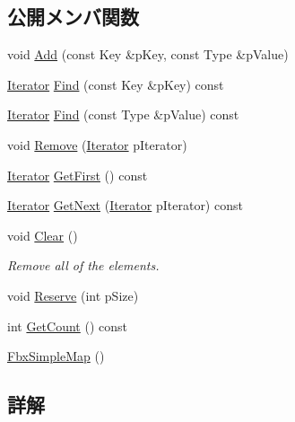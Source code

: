 \subsection*{公開メンバ関数}
\begin{DoxyCompactItemize}
\item 
void \hyperlink{class_fbx_simple_map_aff95473f35a67022ef78d6b81f72670b}{Add} (const Key \&p\+Key, const Type \&p\+Value)
\item 
\hyperlink{class_fbx_simple_map_aaa589eb5e1ccdd11dffd018f3212e13e}{Iterator} \hyperlink{class_fbx_simple_map_a83632d1ae605470b24d92ae8d6fc011f}{Find} (const Key \&p\+Key) const
\item 
\hyperlink{class_fbx_simple_map_aaa589eb5e1ccdd11dffd018f3212e13e}{Iterator} \hyperlink{class_fbx_simple_map_a5a015127a73c38a32b31a753e239159b}{Find} (const Type \&p\+Value) const
\item 
void \hyperlink{class_fbx_simple_map_ab97e03572ab94e42903a9c29c7e904ef}{Remove} (\hyperlink{class_fbx_simple_map_aaa589eb5e1ccdd11dffd018f3212e13e}{Iterator} p\+Iterator)
\item 
\hyperlink{class_fbx_simple_map_aaa589eb5e1ccdd11dffd018f3212e13e}{Iterator} \hyperlink{class_fbx_simple_map_a39c8ffc7721d5934c6f01211f51fd24b}{Get\+First} () const
\item 
\hyperlink{class_fbx_simple_map_aaa589eb5e1ccdd11dffd018f3212e13e}{Iterator} \hyperlink{class_fbx_simple_map_a37468d01716cbf6528a0cc26e82f7e90}{Get\+Next} (\hyperlink{class_fbx_simple_map_aaa589eb5e1ccdd11dffd018f3212e13e}{Iterator} p\+Iterator) const
\item 
void \hyperlink{class_fbx_simple_map_abd94eb8a48a52594555d6818515b1a06}{Clear} ()
\begin{DoxyCompactList}\small\item\em Remove all of the elements. \end{DoxyCompactList}\item 
void \hyperlink{class_fbx_simple_map_a73177350fd95bfea14e39e78d077921f}{Reserve} (int p\+Size)
\item 
int \hyperlink{class_fbx_simple_map_aa1d257d7da92eece92cbf1b04a959ea3}{Get\+Count} () const
\item 
\hyperlink{class_fbx_simple_map_a3e89743411abd2e67f84e942787d4a84}{Fbx\+Simple\+Map} ()
\end{DoxyCompactItemize}


\subsection{詳解}
